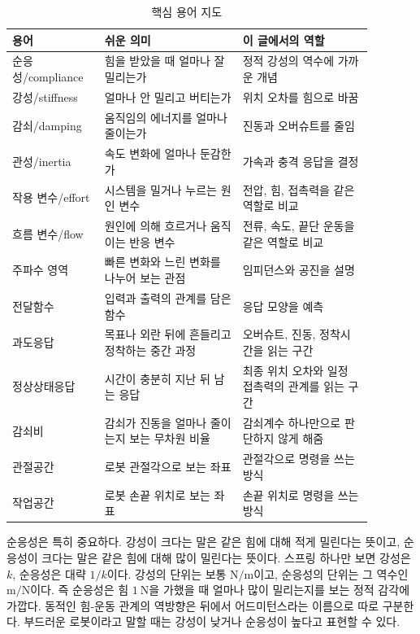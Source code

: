 \begin{table}[!htbp]
  \centering
  \caption{핵심 용어 지도}
  \begin{tabular}{p{0.22\linewidth}p{0.34\linewidth}p{0.32\linewidth}}
    \toprule
    용어 & 쉬운 의미 & 이 글에서의 역할 \\
    \midrule
    순응성/compliance & 힘을 받았을 때 얼마나 잘 밀리는가 & 정적 강성의 역수에 가까운 개념 \\
    강성/stiffness & 얼마나 안 밀리고 버티는가 & 위치 오차를 힘으로 바꿈 \\
    감쇠/damping & 움직임의 에너지를 얼마나 줄이는가 & 진동과 오버슈트를 줄임 \\
    관성/inertia & 속도 변화에 얼마나 둔감한가 & 가속과 충격 응답을 결정 \\
    작용 변수/effort & 시스템을 밀거나 누르는 원인 변수 & 전압, 힘, 접촉력을 같은 역할로 비교 \\
    흐름 변수/flow & 원인에 의해 흐르거나 움직이는 반응 변수 & 전류, 속도, 끝단 운동을 같은 역할로 비교 \\
    주파수 영역 & 빠른 변화와 느린 변화를 나누어 보는 관점 & 임피던스와 공진을 설명 \\
    전달함수 & 입력과 출력의 관계를 담은 함수 & 응답 모양을 예측 \\
    과도응답 & 목표나 외란 뒤에 흔들리고 정착하는 중간 과정 & 오버슈트, 진동, 정착시간을 읽는 구간 \\
    정상상태응답 & 시간이 충분히 지난 뒤 남는 응답 & 최종 위치 오차와 일정 접촉력의 관계를 읽는 구간 \\
    감쇠비 & 감쇠가 진동을 얼마나 줄이는지 보는 무차원 비율 & 감쇠계수 하나만으로 판단하지 않게 해줌 \\
    관절공간 & 로봇 관절각으로 보는 좌표 & 관절각으로 명령을 쓰는 방식 \\
    작업공간 & 로봇 손끝 위치로 보는 좌표 & 손끝 위치로 명령을 쓰는 방식 \\
    \bottomrule
  \end{tabular}
\end{table}

순응성은 특히 중요하다.
강성이 크다는 말은 같은 힘에 대해 적게 밀린다는 뜻이고, 순응성이 크다는 말은 같은 힘에 대해 많이 밀린다는 뜻이다.
스프링 하나만 보면 강성은 $k$, 순응성은 대략 $1/k$이다.
강성의 단위는 보통 $\mathrm{N/m}$이고, 순응성의 단위는 그 역수인 $\mathrm{m/N}$이다.
즉 순응성은 힘 $1~\mathrm{N}$을 가했을 때 얼마나 많이 밀리는지를 보는 정적 감각에 가깝다.
동적인 힘-운동 관계의 역방향은 뒤에서 어드미턴스라는 이름으로 따로 구분한다.
부드러운 로봇이라고 말할 때는 강성이 낮거나 순응성이 높다고 표현할 수 있다.

